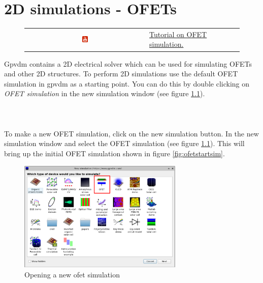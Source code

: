\chapter{2D simulations - OFETs}
\label{sec:ofet}

\begin{figure}[H]

\begin{tabular}{ c l }

\includegraphics[width=0.05\textwidth]{./images/youtube.png}

&
\href{https://www.youtube.com/watch?v=0RK9GEyb4HQ}{Tutorial on OFET simulation.}

\end{tabular}
\end{figure}

Gpvdm contains a 2D electrical solver which can be used for simulating OFETs and other 2D structures.  To perform 2D simulations use the default OFET simulation in gpvdm as a starting point.  You can do this by double clicking on \emph{OFET simulation} in the new simulation window (see figure \ref{fig:ofetnewsim}).
\\
\\
\\
\\




To make a new OFET simulation, click on the new simulation button. In the new simulation window and select the OFET simulation (see figure \ref{fig:ofetnewsim}).  This will bring up the initial OFET simulation shown in figure \ref{fig:ofetstartsim}.

\begin{figure}[H]
\centering
\includegraphics[width=0.7\textwidth]{./images/ofet_0.png}
\caption{Opening a new ofet simulation}
\label{fig:ofetnewsim}
\end{figure}




